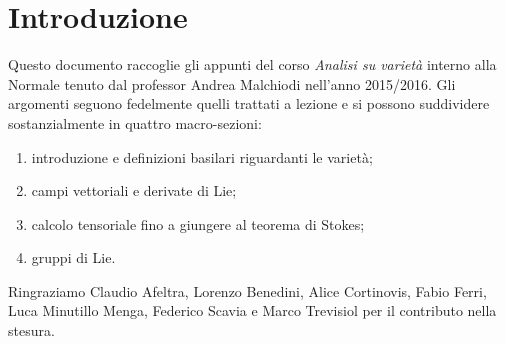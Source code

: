 \chapter{Introduzione}

Questo documento raccoglie gli appunti del corso \emph{Analisi su varietà} interno alla Normale tenuto dal professor Andrea Malchiodi nell'anno 2015/2016.
Gli argomenti seguono fedelmente quelli trattati a lezione e si possono suddividere sostanzialmente in quattro macro-sezioni:
\begin{enumerate}
 \item introduzione e definizioni basilari riguardanti le varietà;
 \item campi vettoriali e derivate di Lie;
 \item calcolo tensoriale fino a giungere al teorema di Stokes;
 \item gruppi di Lie.
\end{enumerate}


Ringraziamo Claudio Afeltra, Lorenzo Benedini, Alice Cortinovis, Fabio Ferri, Luca Minutillo Menga, Federico Scavia e Marco Trevisiol per il contributo nella stesura.